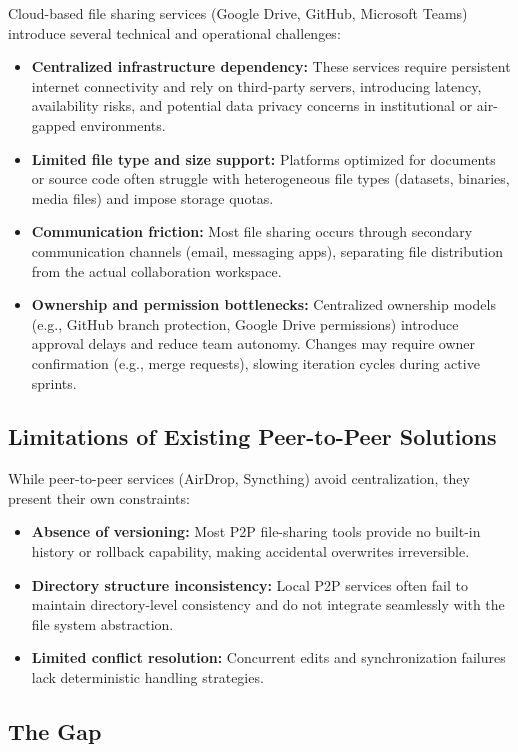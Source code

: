 \documentclass[11pt,oneside]{article}
\begin{document}
Cloud-based file sharing services (Google Drive, GitHub, Microsoft Teams) introduce several technical and operational challenges:
\begin{itemize}
    \item \textbf{Centralized infrastructure dependency:} These services require persistent internet connectivity and rely on third-party servers, introducing latency, availability risks, and potential data privacy concerns in institutional or air-gapped environments.
    \item \textbf{Limited file type and size support:} Platforms optimized for documents or source code often struggle with heterogeneous file types (datasets, binaries, media files) and impose storage quotas.
    \item \textbf{Communication friction:} Most file sharing occurs through secondary communication channels (email, messaging apps), separating file distribution from the actual collaboration workspace.
    \item \textbf{Ownership and permission bottlenecks:} Centralized ownership models (e.g., GitHub branch protection, Google Drive permissions) introduce approval delays and reduce team autonomy. Changes may require owner confirmation (e.g., merge requests), slowing iteration cycles during active sprints.
\end{itemize}

\subsection{Limitations of Existing Peer-to-Peer Solutions}

While peer-to-peer services (AirDrop, Syncthing) avoid centralization, they present their own constraints:
\begin{itemize}
    \item \textbf{Absence of versioning:} Most P2P file-sharing tools provide no built-in history or rollback capability, making accidental overwrites irreversible.
    \item \textbf{Directory structure inconsistency:} Local P2P services often fail to maintain directory-level consistency and do not integrate seamlessly with the file system abstraction.
    \item \textbf{Limited conflict resolution:} Concurrent edits and synchronization failures lack deterministic handling strategies.
\end{itemize}

\subsection{The Gap}
\end{document}
